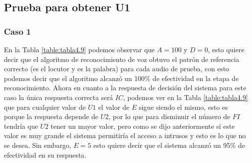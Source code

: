 \subsection{Prueba para obtener U1}
\subsubsection{Caso 1}
En la Tabla \ref{table:tabla4.9} podemos observar que $A = 100$ y $D = 0$, esto quiere decir que el algoritmo de reconocimiento de voz obtuvo el patrón de referencia correcto (es el locutor y es la palabra) para cada audio de prueba, con esto podemos decir que el algoritmo alcanzó un 100\% de efectividad en la etapa de reconocimiento.
\vskip 0.5cm
Ahora en cuanto a la respuesta de decisión del sistema para este caso la única respuesta correcta será $IC$, podemos ver en la Tabla \ref{table:tabla4.9} que para cualquier valor de $U1$ el valor de $E$ sigue siendo el mismo, esto es porque la respuesta depende de $U2$, por lo que para disminuir el número de $FI$ tendría que $U2$ tener un mayor valor, pero como se dijo anteriormente si este valor es muy grande el sistema permitiría el acceso a intrusos y esto es lo que no se desea. Sin embargo, $E = 5$ esto quiere decir que el sistema alcanzó un 95\% de efectividad en su respuesta.

